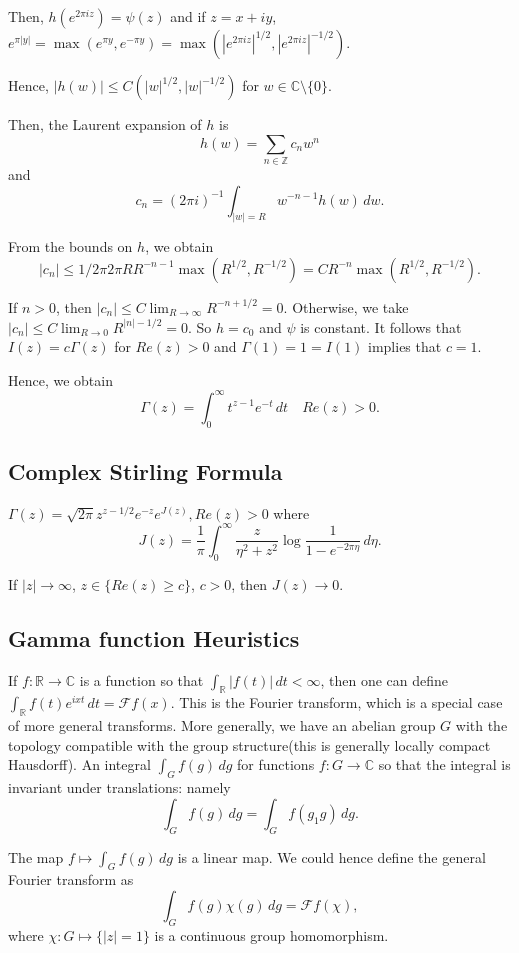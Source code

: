 \documentclass[12pt]{scrartcl}
\newcommand{\Z}{\mathbb{Z}}
\newcommand{\R}{\mathbb{R}}
\newcommand{\C}{\mathbb C}
\begin{document}
Then, $h(e^{2\pi i z}) = \psi(z)$ and if $z = x + iy$, $e^{\pi|y|} = \max (e^{\pi y}, e^{-\pi y}) = \max (|e^{2\pi i z}|^{1/2}, |e^{2\pi i z}|^{-1/2})$.

Hence, $|h(w)| \le C (|w|^{1/2}, |w|^{-1/2})$ for $w \in \C \setminus \{0\}$.

Then, the Laurent expansion of $h$ is 
$$h(w) = \sum_{n \in \Z} c_n w^n$$
and $$c_n = (2\pi i)^{-1}\int_{|w| = R} w^{-n-1} h(w) \,dw.$$

From the bounds on $h$, we obtain
$$|c_n| \le 1/2\pi 2\pi R R^{-n-1} \max(R^{1/2}, R^{-1/2}) = C R^{-n} \max(R^{1/2}, R^{-1/2}).$$

If $n > 0$, then $|c_n| \le C \lim_{R \to \infty} R^{-n+1/2} = 0$.  Otherwise,  we take $|c_n| \le C \lim_{R \to 0} R^{|n| - 1/2} = 0$.  So $h = c_0$ and $\psi$ is constant.  It follows that $I(z) = c\Gamma(z)$ for $Re(z) > 0$ and $\Gamma(1) = 1 = I(1)$ implies that $c = 1$.

Hence, we obtain
$$\Gamma(z) = \int_0^\infty t^{z-1} e^{-t}\,dt \quad Re(z) > 0.$$
\subsection{Complex Stirling Formula}
$\Gamma(z) = \sqrt{2\pi} z^{z- 1/2} e^{-z} e^{J(z)}, Re(z) > 0$ where
$$J(z) = \frac{1}{\pi} \int_0^\infty \frac{z}{\eta^2 + z^2} \log \frac{1}{1 - e^{-2 \pi \eta}} \, d\eta.$$

If $|z| \to \infty$, $z \in \{Re(z) \ge c\}$, $c > 0$, then $J(z) \to 0$.

\subsection{Gamma function Heuristics}
If $f: \R \to \C$ is a function so that $\int_\R |f(t)| \, dt < \infty$, then one can define $\int_\R f(t) e^{ixt}\,dt = \mathcal{F} f(x)$.  This is the Fourier transform, which is a special case of more general transforms.  More generally, we have an abelian group $G$ with the topology compatible with the group structure(this is generally locally compact Hausdorff).  An integral $\int_G f(g) \,dg$ for functions $f:G \to \C$ so that the integral is invariant under translations: namely
$$\int_G f(g)\,dg = \int_G f(g_1 g) \,dg.$$

The map $f \mapsto \int_G f(g)\,dg$ is a linear map.  We could hence define the general Fourier transform as $$\int_G f(g) \chi (g) \,dg = \mathcal Ff(\chi),$$
where $\chi: G \mapsto \{|z| = 1\}$ is a continuous group homomorphism.  
\end{document}
